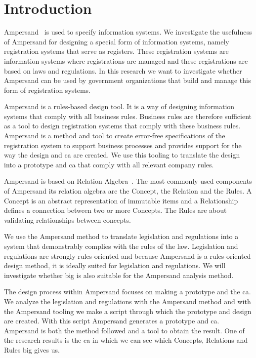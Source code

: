 \newpage
\section{Introduction} \label{Introduction}
Ampersand~\citep{joosten_software_2017} is used to specify information systems.
We investigate the usefulness of Ampersand for designing a special form of information systems, namely registration systems that serve as registers.
These registration systems are information systems where registrations are managed and these registrations are based on laws and regulations.
In this research we want to investigate whether Ampersand can be used by government organizations that build and manage this form of registration systems.

Ampersand is a rules-based design tool.
It is a way of designing information systems that comply with all business rules.
Business rules are therefore sufficient as a tool to design registration systems that comply with these business rules.
Ampersand is a method and tool to create error-free specifications of the registration system to support business processes and provides support for the way the design and \acrlong{ca} are created.
We use this tooling to translate the design into a prototype and \acrshort{ca} that comply with all relevant company rules.

Ampersand is based on Relation Algebra~\citep{maddux_bibliography_2006}.
The most commonly used components of Ampersand its relation algebra are the Concept, the Relation and the Rules.
A Concept is an abstract representation of immutable items and a Relationship defines a connection between two or more Concepts.
The Rules are about validating relationships between concepts.

We use the Ampersand method to translate legislation and regulations into a system that demonstrably complies with the rules of the law.
Legislation and regulations are strongly rules-oriented and because Ampersand is a rules-oriented design method, it is ideally suited for legislation and regulations.
We will investigate whether \acrfull{big} is also suitable for the Ampersand analysis method.

The design process within Ampersand focuses on making a prototype and the \acrlong{ca}.
We analyze the legislation and regulations with the Ampersand method and with the Ampersand tooling we make a script through which the prototype and design are created.
With this script Ampersand generates a prototype and \acrlong{ca}.
Ampersand is both the method followed and a tool to obtain the result.
One of the research results is the \acrlong{ca} in which we can see which Concepts, Relations and Rules \acrshort{big} gives us.

